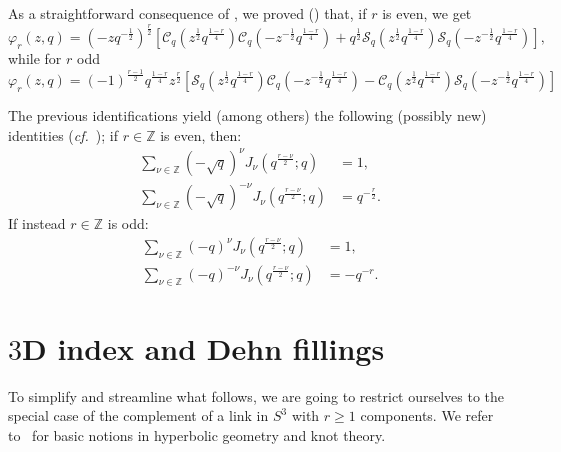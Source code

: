 \documentclass[11pt]{amsart}
\newcommand{\Z}{\mathbb{Z}}
\newcommand{\qsin}{\mathcal{S}_q}
\newcommand{\qcos}{\mathcal{C}_q}
\begin{document}
As a straightforward consequence of \cite[Prop.~1]{Nevanlinna}, we proved (\cite[Sec.~10]{3dindexdehn}) that, if $r$ is even, we get
\begin{equation}\label{eqn:phi_trigonometric_even}
\varphi_r \left(z,q\right) = \left(-z q^{-\frac12}\right)^{\frac{r}{2}} \left[\qcos \left(z^{\frac12} q^{\frac{1-r}{4}}\right) \qcos\left(- z^{-\frac12} q^{\frac{1-r}{4}}\right) + q^{\frac12} \qsin\left(z^{\frac12} q^{\frac{1-r}{4}}\right)\qsin\left(- z^{-\frac12} q^{\frac{1-r}{4}}\right) \right],
\end{equation}
while for $r$ odd
\begin{equation}\label{eqn:phi_trigonometric_odd}
\varphi_r \left(z,q\right) = \left(-1\right)^{\frac{r-1}{2}} q^{\frac{1-r}{4}} z^{\frac{r}{2}}\left[ \qsin\left(z^{\frac12} q^{\frac{1-r}{4}} \right) \qcos\left(-z^{-\frac12} q^{\frac{1-r}{4}}\right) - \qcos\left(z^{\frac12} q^{\frac{1-r}{4}}\right) \qsin\left(-z^{-\frac12} q^{\frac{1-r}{4}} \right)\right]
\end{equation}

The previous identifications yield (among others) the following (possibly new) identities (\textit{cf.}~\cite[Cor.~10.3]{3dindexdehn}); if $r \in \Z$ is even, then:
\begin{align}
\sum_{\nu \in \Z} \left(-\sqrt{q}\right)^\nu  J_{\nu}\left(q^{\frac{r-\nu}{2}};q\right) & =1 ,\\
\sum_{\nu \in \Z} \left(-\sqrt{q}\right)^{-\nu}  J_{\nu}\left(q^{\frac{r-\nu}{2}};q\right)& = q^{-\frac{r}{2}} .
\end{align}
If instead $r \in \Z$ is odd:
\begin{align}
\sum_{\nu \in \Z} \left(-q\right)^\nu J_{\nu}\left(q^{\frac{r-\nu}{2}};q\right)  & =1 ,\\
\sum_{\nu \in \Z} \left(-q\right)^{-\nu} J_{\nu}\left(q^{\frac{r-\nu}{2}};q\right) & = -q^{-r} .
\end{align}




\section{$3$D index and Dehn fillings}\label{sec:3Dindex}

To simplify and streamline what follows, we are going to restrict ourselves to the special case of the complement of a link in $S^3$ with $r \ge 1$ components.
We refer to~\cite{thurston2014three, benedetti1992lectures, purcell2020hyperbolic} for basic notions in hyperbolic geometry and knot theory.
\end{document}
